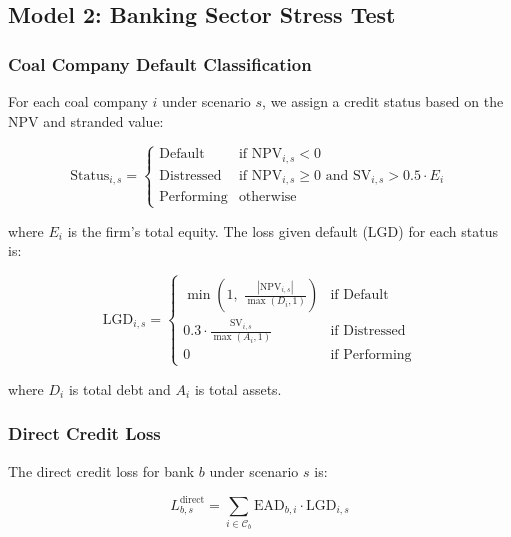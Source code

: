 \subsection{Model 2: Banking Sector Stress Test}
\label{subsec:app_model2}

\subsubsection{Coal Company Default Classification}

For each coal company $i$ under scenario $s$, we assign a credit status based on the NPV and stranded value:

\begin{equation}
\label{eq:app_default_class}
\text{Status}_{i,s} =
\begin{cases}
\text{Default} & \text{if } \text{NPV}_{i,s} < 0 \\
\text{Distressed} & \text{if } \text{NPV}_{i,s} \geq 0 \text{ and } \text{SV}_{i,s} > 0.5 \cdot E_i \\
\text{Performing} & \text{otherwise}
\end{cases}
\end{equation}

\noindent where $E_i$ is the firm's total equity. The loss given default (LGD) for each status is:

\begin{equation}
\label{eq:app_lgd}
\text{LGD}_{i,s} =
\begin{cases}
\min\!\left(1,\; \frac{|\text{NPV}_{i,s}|}{\max(D_i, 1)}\right) & \text{if Default} \\[6pt]
0.3 \cdot \frac{\text{SV}_{i,s}}{\max(A_i, 1)} & \text{if Distressed} \\[6pt]
0 & \text{if Performing}
\end{cases}
\end{equation}

\noindent where $D_i$ is total debt and $A_i$ is total assets.


\subsubsection{Direct Credit Loss}

The direct credit loss for bank $b$ under scenario $s$ is:

\begin{equation}
\label{eq:app_direct_loss}
L_{b,s}^{\text{direct}} = \sum_{i \in \mathcal{C}_b} \text{EAD}_{b,i} \cdot \text{LGD}_{i,s}
\end{equation}

